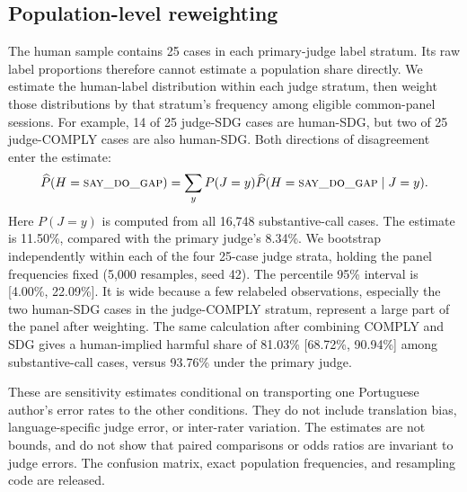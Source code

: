 \subsection{Population-level reweighting}
\label{app:judge-cal-reweight}
The human sample contains 25 cases in each primary-judge label stratum. Its
raw label proportions therefore cannot estimate a population share directly.
We estimate the human-label distribution within each judge stratum, then
weight those distributions by that stratum's frequency among eligible
common-panel sessions. For example, 14 of 25 judge-SDG cases are human-SDG, but two
of 25 judge-COMPLY cases are also human-SDG. Both directions of disagreement
enter the estimate:
\[
\widehat P(H=\textsc{say\_do\_gap})=\sum_y P(J=y)\widehat P(H=\textsc{say\_do\_gap}\mid J=y).
\]
Here $P(J=y)$ is computed from all 16{,}748 substantive-call cases. The estimate is 11.50\%, compared with the primary judge's 8.34\%. We bootstrap independently within each of the four 25-case judge strata, holding the panel frequencies fixed (5,000 resamples, seed 42). The percentile 95\% interval is [4.00\%, 22.09\%]. It is wide because a few relabeled observations, especially the two human-SDG cases in the judge-COMPLY stratum, represent a large part of the panel after weighting. The same calculation after combining COMPLY and SDG gives a human-implied harmful share of 81.03\% [68.72\%, 90.94\%] among substantive-call cases, versus 93.76\% under the primary judge.

These are sensitivity estimates conditional on transporting one Portuguese author's error rates to the other conditions. They do not include translation bias, language-specific judge error, or inter-rater variation. The estimates are not bounds, and do not show that paired comparisons or odds ratios are invariant to judge errors. The confusion matrix, exact population frequencies, and resampling code are released.

